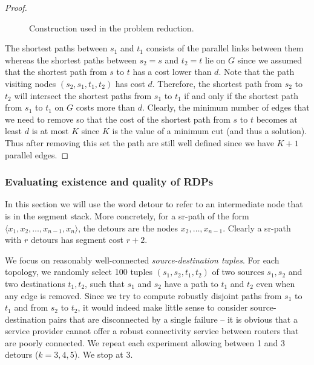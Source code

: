 \begin{proof}
\begin{figure}[H]
\begin{center}
\end{center}
\caption{Construction used in the problem reduction.}
\label{fig:reduction}
\end{figure}

The shortest paths between $s_1$ and $t_1$ consists of the parallel links between them
whereas the shortest paths between $s_2 = s$ and $t_2 = t$ lie on $G$ since we assumed that the shortest
path from $s$ to $t$ has a cost lower than $d$. Note that the path visiting nodes $(s_2, s_1, t_1, t_2)$ has cost
$d$. Therefore, the shortest path from $s_2$ to $t_2$ will intersect the shortest paths from $s_1$ to $t_1$ if and only
if the shortest path from $s_1$ to $t_1$ on $G$ costs more than $d$.
Clearly, the minimum number of edges that we need to remove
so that the cost of the shortest path from $s$ to $t$ becomes at least $d$ is at most $K$ since $K$
is the value of a minimum cut (and thus a solution). Thus after removing this set the path are still well defined
since we have $K + 1$ parallel edges.
\end{proof}

\subsubsection{Evaluating existence and quality of RDPs}

In this section we will use the word detour to refer to an intermediate 
node that is in the segment stack. More concretely, for a sr-path of the form
$\langle x_1, x_2, \ldots, x_{n - 1}, x_n \rangle$, the detours are the nodes
$x_2, \ldots, x_{n - 1}$. Clearly a sr-path with $r$ detours has segment cost
$r + 2$.

We focus on reasonably well-connected \textit{source-destination
tuples}. For each topology, we randomly select 100 tuples $(s_1, s_2, t_1, t_2)$
of two sources $s_1,s_2$ and two destinations $t_1,t_2$, such that $s_1$ and
$s_2$ have a path to $t_1$ and $t_2$ even when any edge is removed. Since we try to
compute robustly disjoint paths from $s_1$ to $t_1$ and from $s_2$ to $t_2$,
it would indeed make little sense to consider source-destination pairs that are
disconnected by a single failure -- it is obvious that a service provider cannot offer
a robust connectivity service between routers that are poorly connected.
We repeat each experiment allowing between 1 and 3 detours ($k = 3, 4, 5$). We stop
at 3.


